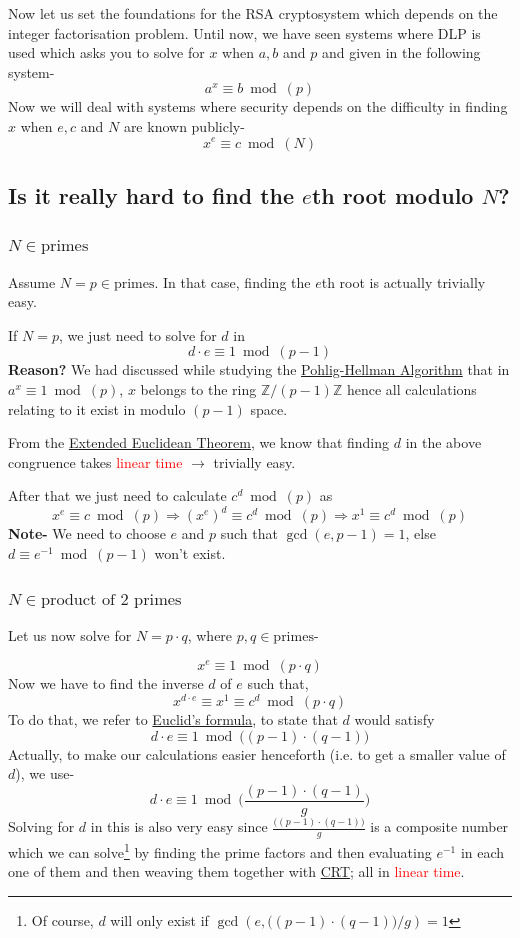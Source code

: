 		Now let us set the foundations for the RSA cryptosystem which depends on the integer factorisation problem. Until now, we have seen systems where DLP is used which asks you to solve for \(x\) when \(a, b \) and \(p\) and given in the following system- \[a^x \equiv b \bmod(p)\] Now we will deal with systems where security depends on the difficulty in finding \(x\) when \(e, c\) and \(N\) are known publicly- \[x^e \equiv c \bmod(N)\]
		
		\subsection{Is it really hard to find the \(e\)th root modulo \(N\)?}
			\subsubsection{\(N\in\text{primes}\)}
				Assume \(N = p \in \text{primes}\). In that case, finding the $e$th root is actually trivially easy. 
				\begin{mybox}
					If \(N = p\), we just need to solve for $d$ in \[d\cdot e\equiv 1 \bmod(p-1)\]\textbf{Reason?} We had discussed while studying the \hyperref[sec:pohlig]{Pohlig-Hellman Algorithm} that in \(a^x \equiv 1 \bmod(p)\), \(x\) belongs to the ring \(\mathbb{Z}/(p-1)\mathbb{Z}\) hence all calculations relating to it exist in modulo \((p-1)\) space.\par
					From the \hyperref[theo:extendedEuclid]{Extended Euclidean Theorem}, we know that finding \(d\) in the above congruence takes \textcolor{red}{linear time} \(\rightarrow\) trivially easy.\par
					After that we just need to calculate \(c^d \bmod(p)\) as \[x^e\equiv c \bmod(p)\Rightarrow(x^e)^d\equiv c^d \bmod(p)\Rightarrow x^1\equiv c^d \bmod(p)\] 
					\textbf{Note-} We need to choose \(e\) and \(p\) such that \(\gcd(e, p-1)=1\), else \(d\equiv e^{-1}\bmod(p-1)\) won't exist. 
				\end{mybox}

			\subsubsection{\(N\in\text{product of 2 primes}\)}	
				Let us now solve for \(N = p \cdot q\), where \(p, q \in \text{primes}\)-\par
				\[x^e\equiv 1\bmod(p\cdot q)\]
				Now we have to find the inverse \(d\) of \(e\) such that, \[x^{d\cdot e}\equiv x^1\equiv c^d\bmod(p\cdot q)\]To do that, we refer to \hyperref[subsec:EuclidFormula]{Euclid's formula}, to state that $d$ would satisfy \[d\cdot e \equiv 1 \bmod\big((p-1)\cdot (q-1)\big)\]Actually, to make our calculations easier henceforth (i.e. to get a smaller value of $d$), we use- \[d\cdot e \equiv 1 \bmod\bigg(\frac{(p-1)\cdot (q-1)}g\bigg)\]
				Solving for \(d\) in this is also very easy since \(\frac{\big((p-1)\cdot (q-1)\big)}{g}\) is a composite number which we can solve\footnote{Of course, $d$ will only exist if $\gcd(e, \big((p-1)\cdot (q-1)\big)/g)=1$} by finding the prime factors and then evaluating \(e^{-1}\) in each one of them and then weaving them together with \hyperref[subsec:chinese]{CRT}; all in \textcolor{red}{linear time}.

